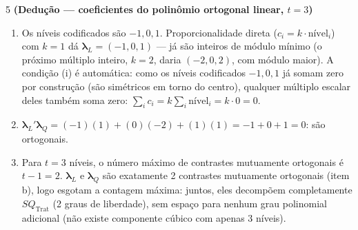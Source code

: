 \documentclass[11pt]{article}
\begin{document}
\begin{questao}{5} \textbf{(Dedução --- coeficientes do polinômio ortogonal linear, $t=3$)}
\end{questao}
\begin{solucao}
\begin{enumerate}[label=(\alph*)]
  \item Os níveis codificados são $-1, 0, 1$. Proporcionalidade direta ($c_i = k\cdot
    \text{nível}_i$) com $k=1$ dá $\boldsymbol\lambda_L = (-1, 0, 1)$ --- já são inteiros de
    módulo mínimo (o próximo múltiplo inteiro, $k=2$, daria $(-2,0,2)$, com módulo maior). A
    condição (i) é automática: como os níveis codificados $-1,0,1$ já somam zero por construção
    (são simétricos em torno do centro), qualquer múltiplo escalar deles também soma zero:
    $\sum_i c_i = k\sum_i \text{nível}_i = k \cdot 0 = 0$.
  \item $\boldsymbol\lambda_L'\boldsymbol\lambda_Q = (-1)(1) + (0)(-2) + (1)(1) = -1+0+1=0$:
    são ortogonais.
  \item Para $t=3$ níveis, o número máximo de contrastes mutuamente ortogonais é $t-1=2$.
    $\boldsymbol\lambda_L$ e $\boldsymbol\lambda_Q$ são exatamente 2 contrastes mutuamente
    ortogonais (item b), logo esgotam a contagem máxima: juntos, eles decompõem completamente
    $SQ_{\text{Trat}}$ (2 graus de liberdade), sem espaço para nenhum grau polinomial adicional
    (não existe componente cúbico com apenas 3 níveis).
\end{enumerate}
\end{solucao}
\end{document}
